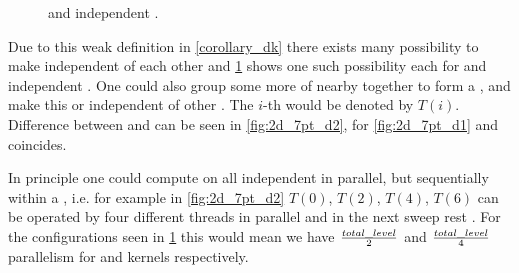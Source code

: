  \begin{figure}[tbhp]
 	\centering
 	\hspace{2.5em}
 	\caption{\DONE and \DTWO independent \levelGroups.}
 	\label{fig:2d-7pt_d1_d2}
 \end{figure}
 
  Due to this weak definition in \cref{corollary_dk} there exists many possibility to make \levels independent of each other and \cref{fig:2d-7pt_d1_d2} shows one such possibility each for \DONE and \DTWO independent \levels. One could also group some more of nearby \levels together to form a \levelGroup, and make this \DONE or \DTWO independent of other \levelGroups. The $i$-th \levelGroup would be denoted by $T(i)$. Difference between \level and  \levelGroup can be seen in \cref{fig:2d_7pt_d2}, for \cref{fig:2d_7pt_d1} \levelGroup and \level coincides.
  
  In principle one could compute on all independent \levelGroups in parallel, but sequentially within a \levelGroup, i.e. for example in \cref{fig:2d_7pt_d2} $T(0)$, $T(2)$, $T(4)$, $T(6)$ can be operated by four different threads in parallel and in the next sweep rest \levelGroups. For the configurations seen in \cref{fig:2d-7pt_d1_d2} this would mean we have $\frac{total\_level}{2}$ and $\frac{total\_level}{4}$ parallelism for \DONE and \DTWO kernels respectively.
  
